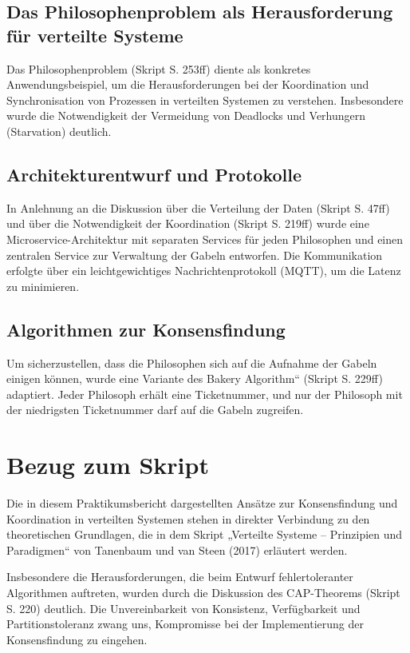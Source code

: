 \documentclass{article}
\begin{document}
\subsection{Das Philosophenproblem als Herausforderung für verteilte Systeme}
Das Philosophenproblem (Skript S. 253ff) diente als konkretes Anwendungsbeispiel, um die Herausforderungen bei der Koordination und Synchronisation von Prozessen in verteilten Systemen zu verstehen. Insbesondere wurde die Notwendigkeit der Vermeidung von Deadlocks und Verhungern (Starvation) deutlich.

\subsection{Architekturentwurf und Protokolle}
In Anlehnung an die Diskussion über die Verteilung der Daten (Skript S. 47ff) und über die Notwendigkeit der Koordination (Skript S. 219ff) wurde eine Microservice-Architektur mit separaten Services für jeden Philosophen und einen zentralen Service zur Verwaltung der Gabeln entworfen. Die Kommunikation erfolgte über ein leichtgewichtiges Nachrichtenprotokoll (MQTT), um die Latenz zu minimieren.

\subsection{Algorithmen zur Konsensfindung}
Um sicherzustellen, dass die Philosophen sich auf die Aufnahme der Gabeln einigen können, wurde eine Variante des Bakery Algorithm“ (Skript S. 229ff) adaptiert. Jeder Philosoph erhält eine Ticketnummer, und nur der Philosoph mit der niedrigsten Ticketnummer darf auf die Gabeln zugreifen.



\section{Bezug zum Skript}

Die in diesem Praktikumsbericht dargestellten Ansätze zur Konsensfindung und Koordination in verteilten Systemen stehen in direkter Verbindung zu den theoretischen Grundlagen, die in dem Skript „Verteilte Systeme – Prinzipien und Paradigmen“ von Tanenbaum und van Steen (2017) erläutert werden.

Insbesondere die Herausforderungen, die beim Entwurf fehlertoleranter Algorithmen auftreten, wurden durch die Diskussion des CAP-Theorems (Skript S. 220) deutlich. Die Unvereinbarkeit von Konsistenz, Verfügbarkeit und Partitionstoleranz zwang uns, Kompromisse bei der Implementierung der Konsensfindung zu eingehen.
\end{document}
